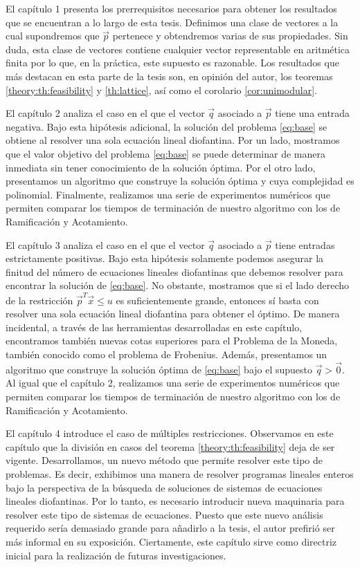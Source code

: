 El capítulo 1 presenta los prerrequisitos necesarios para obtener los resultados que se encuentran a
lo largo de esta tesis. Definimos una clase de vectores a la cual supondremos que $\vec{p}$
pertenece y obtendremos varias de sus propiedades. Sin duda, esta clase de vectores contiene
cualquier vector representable en aritmética finita por lo que, en la práctica, este supuesto es
razonable. Los resultados que más destacan en esta parte de la tesis son, en opinión del autor, los
teoremas \ref{theory:th:feasibility} y \ref{th:lattice}, así como el corolario \ref{cor:unimodular}.

El capítulo 2 analiza el caso en el que el vector $\vec{q}$ asociado a $\vec{p}$ tiene una entrada
negativa. Bajo esta hipótesis adicional, la solución del problema \eqref{eq:base} se obtiene al
resolver una sola ecuación lineal diofantina. Por un lado, mostramos que el valor objetivo del
problema \eqref{eq:base} se puede determinar de manera inmediata sin tener conocimiento de la
solución óptima. Por el otro lado, presentamos un algoritmo que construye la solución óptima y cuya
complejidad es polinomial. Finalmente, realizamos una serie de experimentos numéricos que permiten
comparar los tiempos de terminación de nuestro algoritmo con los de Ramificación y Acotamiento.

El capítulo 3 analiza el caso en el que el vector $\vec{q}$ asociado a $\vec{p}$ tiene entradas
estrictamente positivas. Bajo esta hipótesis solamente podemos asegurar la finitud del número de
ecuaciones lineales diofantinas que debemos resolver para encontrar la solución de \eqref{eq:base}.
No obstante, mostramos que si el lado derecho de la restricción $\vec{p}^T\vec{x} \leq u$ es
suficientemente grande, entonces sí basta con resolver una sola ecuación lineal diofantina para
obtener el óptimo. De manera incidental, a través de las herramientas desarrolladas en este
capítulo, encontramos también nuevas cotas superiores para el Problema de la Moneda, también
conocido como el problema de Frobenius. Además, presentamos un algoritmo que construye la solución
óptima de \eqref{eq:base} bajo el supuesto $\vec{q} > \vec{0}$. Al igual que el capítulo 2,
realizamos una serie de experimentos numéricos que permiten comparar los tiempos de terminación de
nuestro algoritmo con los de Ramificación y Acotamiento.

El capítulo 4 introduce el caso de múltiples restricciones. Observamos en este capítulo que la
división en casos del teorema \ref{theory:th:feasibility} deja de ser vigente. Desarrollamos, un
nuevo método que permite resolver este tipo de problemas. Es decir, exhibimos una manera de resolver
programas lineales enteros bajo la perspectiva de la búsqueda de soluciones de sistemas de
ecuaciones lineales diofantinas. Por lo tanto, es necesario introducir nueva maquinaria para resolver
este tipo de sistemas de ecuaciones. Puesto que este nuevo análisis requerido sería demasiado grande
para añadirlo a la tesis, el autor prefirió ser más informal en su exposición. Ciertamente, este
capítulo sirve como directriz inicial para la realización de futuras investigaciones.


